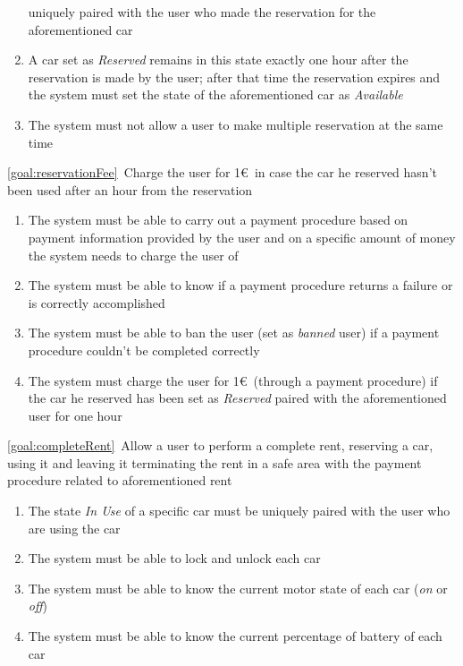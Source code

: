 \begin{description}
\begin{enumerate}[resume*]
 	  			uniquely paired with the user who made the reservation for the aforementioned car
 	  			\item A car set as \emph{Reserved} remains in this state exactly one hour after the
 	  			reservation is made by the user; after that time the reservation expires and the system
 	  			must set the state of the aforementioned car as \emph{Available}
 	  			\item The system must not allow a user to make multiple reservation at the same time
   			\end{enumerate}
  		\item \ref{goal:reservationFee}\ Charge the user for 1\euro\ in case the car he reserved hasn't
  		been used after an hour from the reservation
  			\begin{enumerate}[resume*]
  				\item The system must be able to carry out a payment procedure based on payment
  				information provided by the user and on a specific amount of money the system needs
  				to charge the user of
  				\item The system must be able to know if a payment procedure returns a failure or is
  				correctly accomplished
  				\item The system must be able to ban the user (set as \emph{banned} user) if a payment
  				procedure couldn't be completed correctly
  				\item The system must charge the user for 1\euro\ (through a payment procedure) if
  				the car he reserved has been set as \emph{Reserved} paired with the aforementioned
  				user for one hour
   			\end{enumerate}
  		\item \ref{goal:completeRent}\ Allow a user to perform a complete rent, reserving a car, using
  		it and leaving it terminating the rent in a safe area with the payment procedure related to
  		aforementioned rent
  			\begin{enumerate}[resume*]
  			    \item The state \emph{In Use} of a specific car must be uniquely paired with the user who
  				are using the car	
  				\item The system must be able to lock and unlock each car
  				\item The system must be able to know the current motor state of each car (\emph{on}
  				or \emph{off})
  				\item The system must be able to know the current percentage of battery of each car

\end{enumerate}
\end{description}
